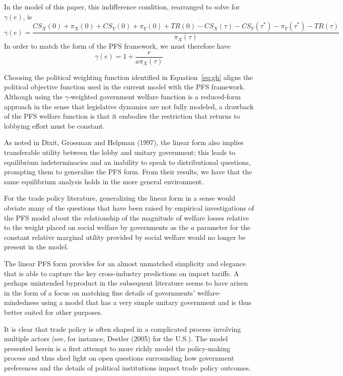 \documentclass[10pt]{article}
\newcommand{\ga}{\gamma}
\begin{document}
In the model of this paper, this indifference condition, rearranged to solve for $\ga(e)$, is
		    \[
		      \ga(e) = \frac{\mathit{CS}_X(0) + \pi_X(0) + \mathit{CS}_Y(0) + \pi_Y(0) + \mathit{TR}(0) - \mathit{CS}_X(\tau) - \mathit{CS}_Y(\tau^*) - \pi_Y(\tau^*) - \mathit{TR}(\tau)}{\pi_X(\tau)}
		    \] 
In order to match the form of the PFS framework, we must therefore have
		    \begin{equation}
		      \ga(e) = 1 + \frac{e}{a\pi_X(\tau)}
		      \label{eq:gh}
		    \end{equation}

Choosing the political weighting function identified in Equation~\ref{eq:gh} aligns the political objective function used in the current model with the PFS framework. Although using the $\ga$-weighted government welfare function is a reduced-form approach in the sense that legislative dynamics are not fully modeled, a drawback of the PFS welfare function is that it embodies the restriction that returns to lobbying effort must be constant.

As noted in Dixit, Grossman and Helpman (1997), the linear form also implies transferable utility between the lobby and unitary government; this leads to equilibrium indeterminacies and an inability to speak to distributional questions, prompting them to generalize the PFS form. From their results, we have that the same equilibrium analysis holds in the more general environment.

For the trade policy literature, generalizing the linear form in a sense would obviate many of the questions that have been raised by empirical investigations of the PFS model about the relationship of the magnitude of welfare losses relative to the weight placed on social welfare by governments as the $a$ parameter for the constant relative marginal utility provided by social welfare would no longer be present in the model.

The linear PFS form provides for an almost unmatched simplicity and elegance that is able to capture the key cross-industry predictions on import tariffs. A perhaps unintended byproduct in the subsequent literature seems to have arisen in the form of a focus on matching fine details of governments' welfare-mindedness using a model that has a very simple unitary government and is thus better suited for other purposes.

It is clear that trade policy is often shaped in a complicated process involving multiple actors (see, for instance, Destler (2005) for the U.S.). The model presented herein is a first attempt to more richly model the policy-making process and thus shed light on open questions surrounding how government preferences and the details of political institutions impact trade policy outcomes.
\end{document}
